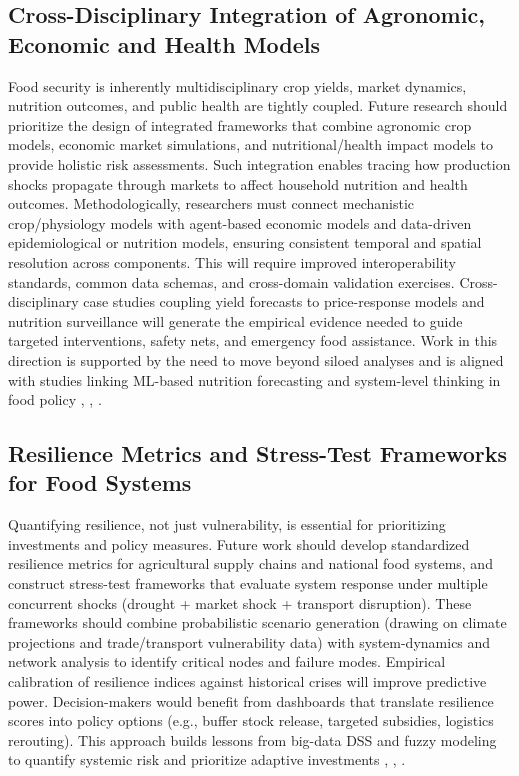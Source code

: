 \documentclass[preprint,12pt]{elsarticle}
\begin{document}
	\subsection{Cross-Disciplinary Integration of Agronomic, Economic and Health Models}
	
	Food security is inherently multidisciplinary crop yields, market
	dynamics, nutrition outcomes, and public health are tightly coupled.
	Future research should prioritize the design of integrated frameworks
	that combine agronomic crop models, economic market simulations, and
	nutritional/health impact models to provide holistic risk assessments.
	Such integration enables tracing how production shocks propagate through
	markets to affect household nutrition and health outcomes.
	Methodologically, researchers must connect mechanistic crop/physiology
	models with agent-based economic models and data-driven epidemiological
	or nutrition models, ensuring consistent temporal and spatial resolution
	across components. This will require improved interoperability
	standards, common data schemas, and cross-domain validation exercises.
	Cross-disciplinary case studies coupling yield forecasts to
	price-response models and nutrition surveillance will generate the
	empirical evidence needed to guide targeted interventions, safety nets,
	and emergency food assistance. Work in this direction is supported by
	the need to move beyond siloed analyses and is aligned with studies
	linking ML-based nutrition forecasting and system-level thinking in food
	policy \cite{ref69}, \cite{ref73}, \cite{ref80}.
	
	\subsection{Resilience Metrics and Stress-Test Frameworks for Food Systems}
	
	Quantifying resilience, not just vulnerability, is essential for
	prioritizing investments and policy measures. Future work should develop
	standardized resilience metrics for agricultural supply chains and
	national food systems, and construct stress-test frameworks that
	evaluate system response under multiple concurrent shocks (drought +
	market shock + transport disruption). These frameworks should combine
	probabilistic scenario generation (drawing on climate projections and
	trade/transport vulnerability data) with system-dynamics and network
	analysis to identify critical nodes and failure modes. Empirical
	calibration of resilience indices against historical crises will improve
	predictive power. Decision-makers would benefit from dashboards that
	translate resilience scores into policy options (e.g., buffer stock
	release, targeted subsidies, logistics rerouting). This approach builds
	lessons from big-data DSS and fuzzy modeling to quantify systemic risk
	and prioritize adaptive investments \cite{ref68}, \cite{ref83}, \cite{ref75}.
	
\end{document}
